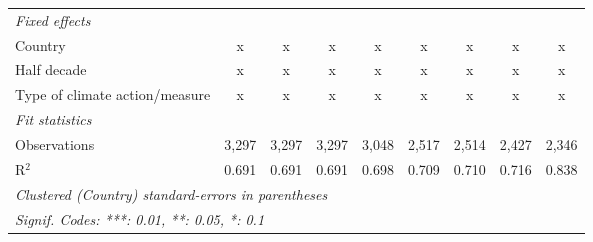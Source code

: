 \begin{table}[htbp]
\begin{tabular}{lcccccccc}
      \emph{Fixed effects}\\
      Country                                                                & x       & x       & x           & x           & x             & x             & x              & x\\  
      Half decade                                                            & x       & x       & x           & x           & x             & x             & x              & x\\  
      Type of climate action/measure                                         & x       & x       & x           & x           & x             & x             & x              & x\\  
      \midrule \emph{Fit statistics}\\
      Observations                                                           & 3,297   & 3,297   & 3,297       & 3,048       & 2,517         & 2,514         & 2,427          & 2,346\\  
      R$^2$                                                                  & 0.691   & 0.691   & 0.691       & 0.698       & 0.709         & 0.710         & 0.716          & 0.838\\  
      \midrule
      \multicolumn{9}{l}{\emph{Clustered (Country) standard-errors in parentheses}}\\
      \multicolumn{9}{l}{\emph{Signif. Codes: ***: 0.01, **: 0.05, *: 0.1}}\\
   \end{tabular}
\end{table}


